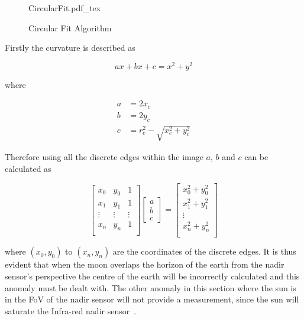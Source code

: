 \begin{figure}[!hbt]
	\centering
	\def\svgwidth{14cm}
	{CircularFit.pdf_tex}
	\caption{Circular Fit Algorithm}
	\label{fig:CircularFit}
\end{figure}

Firstly the curvature is described as 

\begin{equation}
	ax + bx + c = x^2 + y^2
\end{equation}

where 

\begin{equation}
	\begin{aligned}
		a &= 2x_c \\
		b &= 2y_c \\
		c &= r_c^2-\sqrt{x_c^2 + y_c^2}
	\end{aligned}
\end{equation}

Therefore using all the discrete edges within the image $a$, $b$ and $c$ can be calculated as

\begin{equation}
	\begin{bmatrix}
		x_0 & y_0 & 1\\
		x_1 & y_1 & 1\\
		\vdots & \vdots & \vdots\\
		x_n & y_n & 1\\
	\end{bmatrix}	\begin{bmatrix}
	a\\
	b\\
	c
\end{bmatrix} = \begin{bmatrix}
		x_0^2 + y_0^2\\
		x_1^2 + y_1^2\\
		\vdots \\
		x_n^2 + y_n^2\\
	\end{bmatrix}
\end{equation}

where $(x_0,y_0)$ to $(x_n, y_n)$ are the coordinates of the discrete edges. It is thus evident that when the moon overlaps the horizon of the earth from the nadir sensor's perspective the centre of the earth will be incorrectly calculated and this anomaly must be dealt with. The other anomaly in this section where the sun is in the FoV of the nadir sensor will not provide a measurement, since the sun will saturate the Infra-red nadir sensor~\cite{Wessels2018}.

